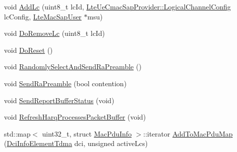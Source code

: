 \begin{DoxyCompactItemize}
\item 
void \hyperlink{classns3_1_1MmWaveUeMac_a5f38e611e27881a8218fe882cf22bc91}{Add\+Lc} (uint8\+\_\+t lc\+Id, \hyperlink{structns3_1_1LteUeCmacSapProvider_1_1LogicalChannelConfig}{Lte\+Ue\+Cmac\+Sap\+Provider\+::\+Logical\+Channel\+Config} lc\+Config, \hyperlink{classns3_1_1LteMacSapUser}{Lte\+Mac\+Sap\+User} $\ast$msu)
\item 
void \hyperlink{classns3_1_1MmWaveUeMac_a9a4aa10c8f649c8fe446d89a9ec8e458}{Do\+Remove\+Lc} (uint8\+\_\+t lc\+Id)
\item 
void \hyperlink{classns3_1_1MmWaveUeMac_af49f913c763be3275728e20fe14c10ee}{Do\+Reset} ()
\item 
void \hyperlink{classns3_1_1MmWaveUeMac_a57dcf69b3aeb8f5050a0e04949c82376}{Randomly\+Select\+And\+Send\+Ra\+Preamble} ()
\item 
void \hyperlink{classns3_1_1MmWaveUeMac_ab114a10102da7afa498a865f6ced38e7}{Send\+Ra\+Preamble} (bool contention)
\item 
void \hyperlink{classns3_1_1MmWaveUeMac_a6c573850c4b03def8ba0060b7c6d5711}{Send\+Report\+Buffer\+Status} (void)
\item 
void \hyperlink{classns3_1_1MmWaveUeMac_af35c28dc87c1cc3aefe519aca65a05d6}{Refresh\+Harq\+Processes\+Packet\+Buffer} (void)
\item 
std\+::map$<$ uint32\+\_\+t, struct \hyperlink{structns3_1_1MacPduInfo}{Mac\+Pdu\+Info} $>$\+::iterator \hyperlink{classns3_1_1MmWaveUeMac_aa1511195bae11decbb06c163fe65891b}{Add\+To\+Mac\+Pdu\+Map} (\hyperlink{structns3_1_1DciInfoElementTdma}{Dci\+Info\+Element\+Tdma} dci, unsigned active\+Lcs)
\end{DoxyCompactItemize}
